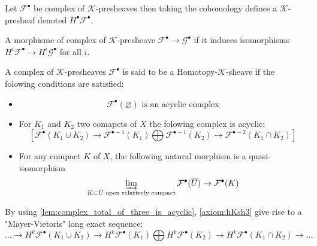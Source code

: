 \begin{definition}\label{def:cohomology_of_k-prsh}
    Let $\mathcal{F}^{\bullet}$ be complex of $\mathcal{K}$-presheaves then taking the cohomology defines a $\mathcal{K}$-presheaf denoted $H^{\bullet}\mathcal{F}^{\bullet}$.
\end{definition}

\begin{definition}\label{def:quasi_iso_of_complex_of_k-prsh}
    A morphisme of complex of $\mathcal{K}$-presheave $\mathcal{F}^{\bullet}\to\mathcal{G}^{\bullet}$ if it induces isomorphisms $H^i\mathcal{F}^{\bullet}\to H^i\mathcal{G}^{\bullet}$ for all $i$.
\end{definition}

\begin{definition}\label{def:homotopy_k_sheaf}
    A complex of $\mathcal{K}$-presheaves $\mathcal{F}^{\bullet}$ is said to be a Homotopy-$\mathcal{K}$-sheave if the folowing conditions are satisfied:\begin{itemize}
        \item\begin{equation}\label{axiom:hKsh1}
            \mathcal{F}^{\bullet}(\varnothing) \text{ is an acyclic complex}
        \end{equation}
        \item For $K_1$ and $K_2$ two comapcts of $X$ the folowing complex is acyclic:\begin{equation}\label{axiom:hKsh2}
             [\mathcal{F}^{\bullet}(K_1\cup K_2)\to \mathcal{F}^{\bullet-1}(K_1)\bigoplus\mathcal{F}^{\bullet-1}(K_2)\to \mathcal{F}^{\bullet-2}(K_1\cap K_2) ]
        \end{equation}
        \item For any compact $K$ of $X$, the following natural morphism is a quasi-isomorphism \begin{equation}\label{axiom:hKsh3}
            \varinjlim\limits_{K\subset U\text{ open relatively compact}}\mathcal{F}^{\bullet}(\overline{U})\to \mathcal{F}^{\bullet}(K)
        \end{equation}
    \end{itemize}
\end{definition}

\begin{remark}\label{lem:Mayer_Vietoris}
    By using \ref{lem:complex_total_of_three_is_acyclic}, \eqref{axiom:hKsh3} give rise to a "Mayer-Vietoris" long exact sequence: \[\ldots \to H^k \mathcal{F}^{\bullet}(K_1\cup K_2)\to H^k \mathcal{F}^{\bullet}(K_1)\bigoplus H^k\mathcal{F}^{\bullet}(K_2)\to H^k \mathcal{F}^{\bullet}(K_1\cap K_2)\to \ldots\]
\end{remark}

